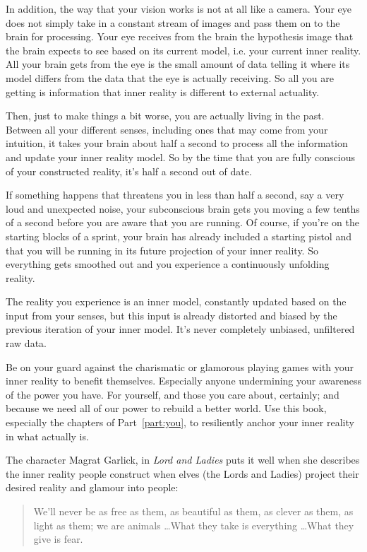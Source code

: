 In addition, the way that your vision works is not at all like a camera. Your eye does not simply take in a constant stream of images and pass them on to the brain for processing. Your eye receives from the brain the hypothesis image that the brain expects to see based on its current model, i.e. your current inner reality. All your brain gets from the eye is the small amount of data telling it where its model differs from the data that the eye is actually receiving. So all you are getting is information that inner reality is different to external actuality.


Then, just to make things a bit worse, you are actually living in the past. Between all your different senses, including ones that may come from your intuition, it takes your brain about half a second to process all the information and update your inner reality model. So by the time that you are fully conscious of your constructed reality, it's half a second out of date.


If something happens that threatens you in less than half a second, say a very loud and unexpected noise, your subconscious brain gets you moving a few tenths of a second before you are aware that you are running. Of course, if you're on the starting blocks of a sprint, your brain has already included a starting pistol and that you will be running in its future projection of your inner reality. So everything gets smoothed out and you experience a continuously unfolding reality.


The reality you experience is an inner model, constantly updated based on the input from your senses, but this input is already distorted and biased by the previous iteration of your inner model. It's never completely unbiased, unfiltered raw data.


Be on your guard against the charismatic or glamorous playing games with your inner reality to benefit themselves. Especially anyone undermining your awareness of the power you have. For yourself, and those you care about, certainly; and because we need all of our power to rebuild a better world. Use this book, especially the chapters of Part~\ref{part:you}, to resiliently anchor your inner reality in what actually is. 


The character Magrat Garlick, in \emph{Lord and Ladies}\cite{pratchett-lords} puts it well when she describes the inner reality people construct when elves (the Lords and Ladies) project their desired reality and glamour into people: \begin{quote} We’ll never be as free as them, as beautiful as them, as clever as them, as light as them; we are animals \ldots What they take is everything \ldots What they give is fear.  \end{quote} 


